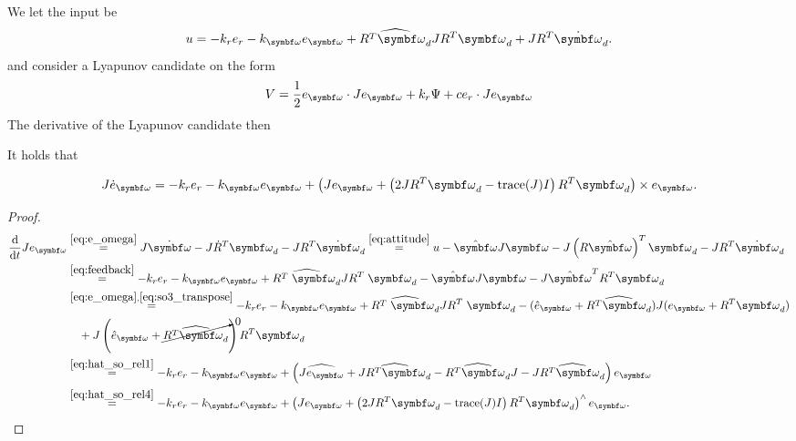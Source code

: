 We let the input be
\begin{equation}
  u = -k_r e_r - k_\bomega e_\bomega + \widehat{R^T \bomega_d} J R^T \bomega_d + J R^T \dot \bomega_d.
\end{equation}
and consider a Lyapunov candidate on the form
\begin{equation}
  V = \frac{1}{2} e_\bomega \cdot J e_\bomega + k_r \Psi + c e_r \cdot J e_\bomega
\end{equation}
The derivative of the Lyapunov candidate then \begin{proposition}
  It holds that
\end{proposition}
\begin{equation}
  \label{eq:myJeo_dot}
  J \dot e_\bomega = -k_r e_r - k_\bomega e_\bomega + \left( J e_\bomega + \left(2 J R^T \bomega_d - \text{trace}(J) I \right) R^T \bomega_d \right) \times e_\bomega.
\end{equation}
\begin{proof}
  \begin{equation*}
    \begin{aligned}
      \frac{\mathrm{d}}{\mathrm{d}t} J e_\bomega & \overset{\eqref{eq:e_omega}}= J \dot \bomega - J \dot R^T \bomega_d - J R^T \dot \bomega_d \overset{\eqref{eq:attitude}}= u - \hat \bomega J \bomega - J \left( R \hat \bomega \right)^T \bomega_d - J R^T \dot \bomega_d \\
                                                 & \overset{\eqref{eq:feedback}}= -k_r e_r - k_\bomega e_\bomega + \widehat{R^T \; {\bomega_d}} J R^T \; {\bomega_d} - \hat \bomega J \bomega - J \hat \bomega^T R^T \bomega_d                                               \\
                                                 & \overset{\eqref{eq:e_omega}, \eqref{eq:so3_transpose}}= -k_r e_r - k_\bomega e_\bomega + \widehat{R^T \; {\bomega_d}} J R^T \; {\bomega_d} - (\hat e_\bomega + \widehat{R^T \bomega_d}) J (e_\bomega + {R^T \bomega_d})   \\
                                                 & \quad + J \left( \hat e_\bomega + \cancelto{0}{\widehat{R^T \bomega_d}} \right) R^T \bomega_d                                                                                                                             \\
                                                 & \overset{\eqref{eq:hat_so_rel1}}= -k_r e_r - k_\bomega e_\bomega + \left( \widehat{J e_\bomega} + \widehat{J R^T \bomega_d} - \widehat{R^T \bomega_d} J - J \widehat{R^T \bomega_d} \right) e_\bomega                     \\
                                                 & \overset{\eqref{eq:hat_so_rel4}}= -k_r e_r - k_\bomega e_\bomega + \left( J e_\bomega + \left(2 J R^T \bomega_d - \text{trace}(J) I \right) R^T \bomega_d \right)^\wedge e_\bomega.
    \end{aligned}
  \end{equation*}
\end{proof}

